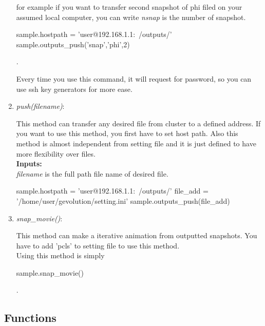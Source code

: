 \documentclass[a4paper, 12 pt]{article}
\begin{document}
\begin{enumerate}
for example if you want to transfer second snapshot of phi filed on your assumed local computer, you can write
\textit{nsnap} is the number of snapshot.\\

\begin{python}[language=Python, caption=outputs push]
sample.hostpath = 'user@192.168.1.1:~/outputs/'
sample.outputs_push('snap','phi',2)
\end{python}.

Every time you use this command, it will request for password, so you can use ssh key generators for more ease.

\item \textit{push(filename)}:

This method can transfer any desired file from cluster to a defined address. If you want to use this method, you first have to set host path. Also this method is almost independent from setting file and it is just defined to have more flexibility over files.\\

\textbf{Inputs:}\\
\textit{filename} is the full path file name of desired file.\\

\begin{python}[language=Python, caption=push]
sample.hostpath = 'user@192.168.1.1:~/outputs/'
file_add = '/home/user/gevolution/setting.ini'
sample.outputs_push(file_add)
\end{python}

\item \textit{snap\_movie()}:

This method can make a iterative animation from outputted snapshots. You have to add 'pcls' to setting file to use this method.\\
Using this method is simply 
\begin{python}[language=Python, caption=snap movie]
sample.snap_movie()
\end{python}.

\end{enumerate}


\subsection{Functions}
\end{document}
